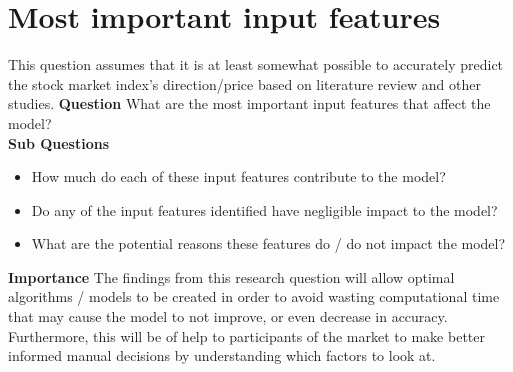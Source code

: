 \section{Most important input features}
This question assumes that it is at least somewhat possible to accurately predict the stock market index's
direction/price based on literature review and other studies.
\textbf{Question} What are the most important input features that affect the model?\\
\textbf{Sub Questions}
\begin{itemize}
    \item How much do each of these input features contribute to the model?
    \item Do any of the input features identified have negligible impact to the model?
    \item What are the potential reasons these features do / do not impact the model?
\end{itemize}

\textbf{Importance} The findings from this research question will allow optimal algorithms /
models to be created in order to avoid wasting computational time that may cause the model to 
not improve, or even decrease in accuracy. Furthermore, this will be of help to participants of
the market to make better informed manual decisions by understanding which factors to look
at.